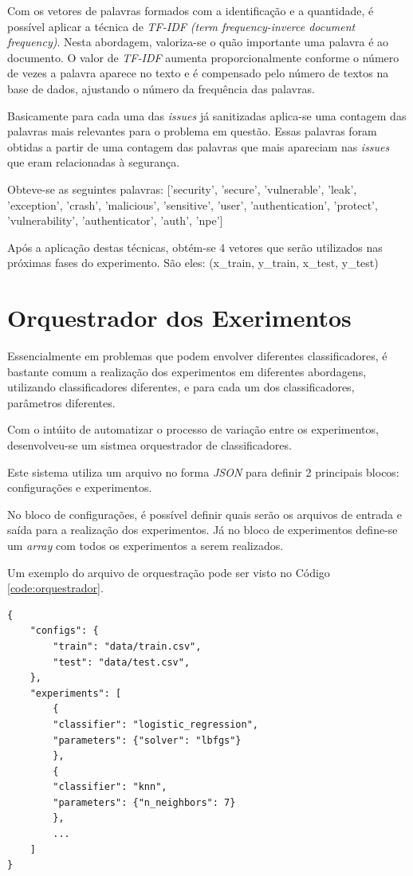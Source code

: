 \documentclass[conference]{IEEEtran}
\begin{document}
Com os vetores de palavras formados com a identificação e a quantidade, é possível aplicar a técnica de \textit{TF-IDF (term frequency-inverce document frequency)}.  Nesta abordagem, valoriza-se o quão importante uma palavra é ao documento. O valor de \textit{TF-IDF} aumenta proporcionalmente conforme o número de vezes a palavra aparece no texto e é compensado pelo número de textos na base de dados, ajustando o número da frequência das palavras. \cite{Manning:InformationRetrieval}

Basicamente para cada uma das \textit{issues} já sanitizadas aplica-se uma contagem das palavras mais relevantes para o problema em questão. Essas palavras foram obtidas a partir de uma contagem das palavras que mais apareciam nas \textit{issues} que eram relacionadas à segurança.

Obteve-se as seguintes palavras: ['security', 'secure', 'vulnerable', 'leak', 'exception', 'crash', 'malicious',
'sensitive', 'user', 'authentication', 'protect', 'vulnerability', 'authenticator', 'auth', 'npe']

Após a aplicação destas técnicas, obtém-se 4 vetores que serão utilizados nas próximas fases do experimento. São eles: (x\_train, y\_train, x\_test, y\_test)

\section{Orquestrador dos Exerimentos}

Essencialmente em problemas que podem envolver diferentes classificadores, é bastante comum a realização dos experimentos em diferentes abordagens, utilizando classificadores diferentes, e para cada um dos classificadores, parâmetros diferentes.

Com o intúito de automatizar o processo de variação entre os experimentos, desenvolveu-se um sistmea orquestrador de classificadores.

Este sistema utiliza um arquivo no forma \textit{JSON} para definir 2 principais blocos: configurações e experimentos.

No bloco de configurações, é possível definir quais serão os arquivos de entrada e saída para a realização dos experimentos. Já no bloco de experimentos define-se um \textit{array} com todos os experimentos a serem realizados.

Um exemplo do arquivo de orquestração pode ser visto no Código \ref{code:orquestrador}.

\begin{lstlisting}[caption={JSON do Orquestrador},captionpos=b,frame=single,label={code:orquestrador}]
{
    "configs": {
        "train": "data/train.csv",
        "test": "data/test.csv",
    },
    "experiments": [
        {
        "classifier": "logistic_regression",
        "parameters": {"solver": "lbfgs"}
        },
        {
        "classifier": "knn",
        "parameters": {"n_neighbors": 7}
        },
        ...
    ]
}
\end{lstlisting}
\end{document}
